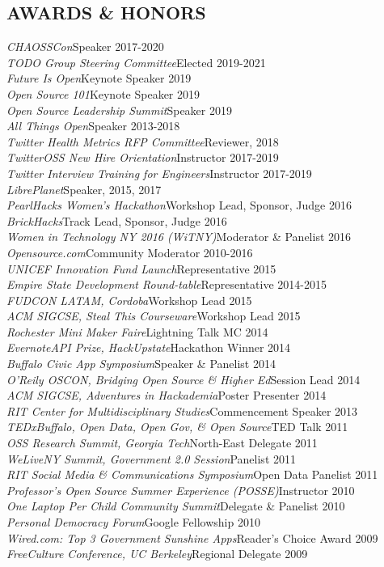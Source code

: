 \documentclass[margin]{res}
\newcommand{\event}[2]{{\it #1}\hfill #2\\}
\newcommand{\award}[2]{{\it #1}\hfill #2\\}
\begin{document}
\begin{resume}
\section{AWARDS \& HONORS}
    \event{CHAOSSCon}{Speaker 2017-2020}
    \event{TODO Group Steering Committee}{Elected 2019-2021}
    \event{Future Is Open}{Keynote Speaker 2019}
    \event{Open Source 101}{Keynote Speaker 2019}
    \event{Open Source Leadership Summit}{Speaker 2019}
    \event{All Things Open}{Speaker 2013-2018}
    \event{Twitter Health Metrics RFP Committee}{Reviewer, 2018}
    \event{TwitterOSS New Hire Orientation}{Instructor 2017-2019}
    \event{Twitter Interview Training for Engineers}{Instructor 2017-2019}
    \event{LibrePlanet}{Speaker, 2015, 2017}
    \event{PearlHacks Women's Hackathon}{Workshop Lead, Sponsor, Judge 2016}
    \event{BrickHacks}{Track Lead, Sponsor, Judge 2016}
    \event{Women in Technology NY 2016 (WiTNY)}{Moderator \& Panelist 2016}
    \event{Opensource.com}{Community Moderator 2010-2016}
    \event{UNICEF Innovation Fund Launch}{Representative 2015}
    \event{Empire State Development Round-table}{Representative 2014-2015}
    \event{FUDCON LATAM, Cordoba}{Workshop Lead 2015}
    \award{ACM SIGCSE, Steal This Courseware}{Workshop Lead 2015}
    \event{Rochester Mini Maker Faire}{Lightning Talk MC 2014}
    \award{EvernoteAPI Prize, HackUpstate}{Hackathon Winner 2014}
    \award{Buffalo Civic App Symposium}{Speaker \& Panelist 2014}
    \award{O'Reily OSCON, Bridging Open Source \& Higher Ed}{Session Lead 2014}
    \award{ACM SIGCSE, Adventures in Hackademia}{Poster Presenter 2014}
    \award{RIT Center for Multidisciplinary Studies}{Commencement Speaker 2013}
    \award{TEDxBuffalo, Open Data, Open Gov, \& Open Source}{TED Talk 2011}
    \award{OSS Research Summit, Georgia Tech}{North-East Delegate 2011}
    \award{WeLiveNY Summit, Government 2.0 Session}{Panelist 2011}
    \award{RIT Social Media \& Communications Symposium}{Open Data Panelist 2011}
    \event{Professor's Open Source Summer Experience (POSSE)}{Instructor 2010}
    \award{One Laptop Per Child Community Summit}{Delegate \& Panelist 2010}
    \award{Personal Democracy Forum}{Google Fellowship 2010}
    \award{Wired.com: Top 3 Government Sunshine Apps}{Reader's Choice Award 2009}
    \award{FreeCulture Conference, UC Berkeley}{Regional Delegate 2009}


\end{resume}
\end{document}
